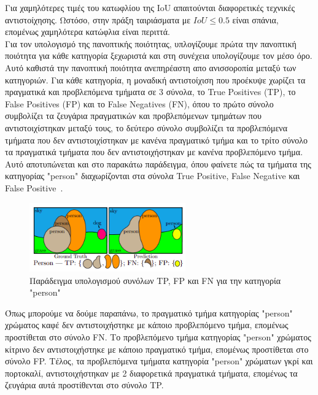 \documentclass[12pt]{article}
\numberwithin{equation}{section}
\begin{document}
Για χαμηλότερες τιμές του κατωφλίου της IoU απαιτούνται διαφορετικές τεχνικές αντιστοίχησης. Ωστόσο, στην πράξη ταιριάσματα με \(IoU \leq 0.5 \) είναι σπάνια, επομένως χαμηλότερα κατώφλια είναι περιττά. \\

Για τον υπολογισμό της πανοπτικής ποιότητας, υπλογίζουμε πρώτα την πανοπτική ποιότητα για κάθε κατηγορία ξεχωριστά και στη συνέχεια υπολογίζουμε τον μέσο όρο. Αυτό καθιστά την πανοπτική ποιότητα ανεπηρέαστη απο ανισσοροπία μεταξύ των κατηγοριών. Για κάθε κατηγορία, η μοναδική αντιστοίχιση που προέκυψε χωρίζει τα πραγματικά και προβλεπόμενα τμήματα σε 3 σύνολα, το True Positives (TP), το False Positives (FP) και το False Negatives (FN), όπου το πρώτο σύνολο συμβολίζει τα ζευγάρια πραγματικών και προβλεπόμενων τμημάτων που αντιστοιχίστηκαν μεταξύ τους, το δεύτερο σύνολο συμβολίζει τα προβλεπόμενα τμήματα που δεν αντιστοιχίστηκαν με κανένα πραγματικό τμήμα και το τρίτο σύνολο τα πραγματικά τμήματα που δεν αντιστοιχήστηκαν με κανένα προβλεπόμενο τμήμα. Αυτό αποτυπώνεται και στο παρακάτω παράδειγμα, όπου φαίνετε πώς τα τμήματα της κατηγορίας "person" διαχωρίζονται στα σύνολα True Positive, False Negative και False Positive~\cite{Kirillov_2019_CVPR}. \\

\begin{figure}[h!]
  \centering
  \includegraphics[width=0.6\textwidth]{images/PS_GT.png} %
  \caption{Παράδειγμα υπολογισμού συνόλων TP, FP και FN για την κατηγορία "person"}
  \label{figure 10}
\end{figure}

\noindent Όπως μπορούμε να δούμε παραπάνω, το πραγματικό τμήμα κατηγορίας "person" χρώματος καφέ δεν αντιστοιχήστηκε με κάποιο προβλεπόμενο τμήμα, επομένως προστίθεται στο σύνολο FN. Το προβλεπόμενο τμήμα κατηγορίας "person" χρώματος κίτρινο δεν αντιστοιχήστηκε με κάποιο πραγματικό τμήμα, επομένως προστίθεται στο σύνολο FP. Τέλος, τα  προβλεπόμενα τμήματα κατηγορία "person" χρώματων γκρί και πορτοκαλί, αντιστοιχήστηκαν με 2 διαφορετικά πραγματικά τμήματα, επομένως τα ζευγάρια αυτά προστίθενται στο σύνολο TP. \\
\end{document}
